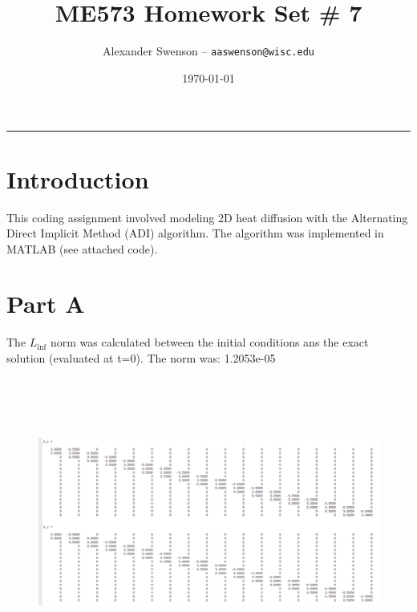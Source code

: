\documentclass[12pt]{article}
\title{ME573 Homework Set \# 7}
\author{Alexander Swenson -- \texttt{aaswenson@wisc.edu}}
\date{\today}
\begin{document}
	
	\maketitle
	
	\vspace{-0.3in}
	\noindent
	\rule{\linewidth}{0.4pt}
	
	\noindent
	
	
	\section{Introduction}
	
	\noindent This coding assignment involved modeling 2D heat diffusion with the Alternating Direct Implicit Method (ADI) algorithm.	The algorithm was implemented in MATLAB (see attached code).
	
	
	\section{Part A}
	
	\noindent The $L_{\inf}$ norm was calculated between the initial conditions ans the exact solution (evaluated at t=0). The norm was: 1.2053e-05
	
	\begin{figure}[H]
		\centering
		\includegraphics[height=3.75in]{matrixAxAy.png}
		\label{fig:problem2_plot}
	\end{figure}
	
\end{document}
